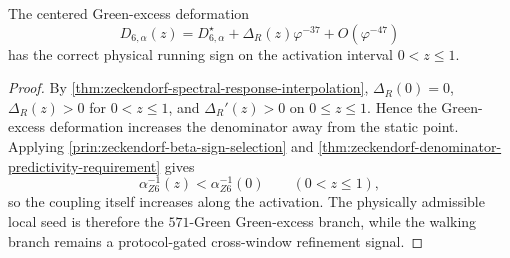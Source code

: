 
\begin{theorem}
\label{thm:zeckendorf-green-excess-passes-beta-sign-test}
The centered Green-excess deformation
$$
  D_{6,\alpha}(z)
  =
  D_{6,\alpha}^{\star}
  +
  \Delta_R(z)\varphi^{-37}
  +
  O(\varphi^{-47})
$$
has the correct physical running sign on the activation interval
$0<z\leq1$.
\end{theorem}
\begin{proof}
By \autoref{thm:zeckendorf-spectral-response-interpolation},
$\Delta_R(0)=0$, $\Delta_R(z)>0$ for $0<z\leq1$, and
$\Delta_R'(z)>0$ on $0\leq z\leq1$. Hence the Green-excess deformation
increases the denominator away from the static point. Applying
\autoref{prin:zeckendorf-beta-sign-selection} and
\autoref{thm:zeckendorf-denominator-predictivity-requirement} gives
$$
  \alpha_{Z6}^{-1}(z)<\alpha_{Z6}^{-1}(0)
  \qquad(0<z\leq1),
$$
so the coupling itself increases along the activation. The physically
admissible local seed is therefore the $571$-Green Green-excess branch,
while the walking branch remains a protocol-gated cross-window
refinement signal.
\end{proof}
